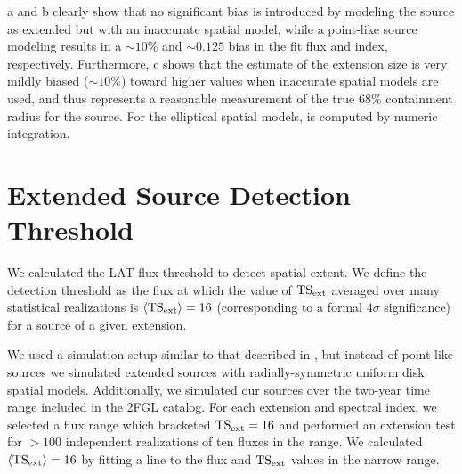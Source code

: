 a and b clearly show that
no significant bias is introduced by modeling the source as extended
but with an inaccurate spatial model, while a point-like source modeling
results in a $\sim10\%$ and $\sim0.125$ bias in the fit flux and index,
respectively.  
Furthermore, c shows that the \rsixeight estimate of
the extension size is very mildly biased ($\sim10\%$) toward higher values
when inaccurate spatial models are used, and thus represents a reasonable
measurement of the true 68\% containment radius for the source.
For the elliptical spatial models, \rsixeight is computed by numeric integration.


\section{Extended Source Detection Threshold}

We calculated the LAT flux 
threshold to detect spatial extent. We define the detection threshold as the flux at
which the value of $\mathrm{TS}_\mathrm{ext}$ averaged over many statistical realizations is
$\langle\mathrm{TS}_\mathrm{ext}\rangle=16$ 
(corresponding to a formal $4\sigma$ significance)
for a source of a given extension.

We used a simulation setup similar to that described in
, but instead of point-like sources
we simulated extended sources with radially-symmetric uniform disk spatial 
models. Additionally, we simulated our sources over the two-year
time range included in the 2FGL catalog.  For each extension and spectral index,
we selected a flux range which bracketed $\mathrm{TS}_\mathrm{ext}=16$ and performed an
extension test for $>100$ independent realizations of ten fluxes in
the range.  We calculated $\langle\mathrm{TS}_\mathrm{ext}\rangle=16$ by fitting a line
to the flux and $\mathrm{TS}_\mathrm{ext}$ values in the narrow range.


